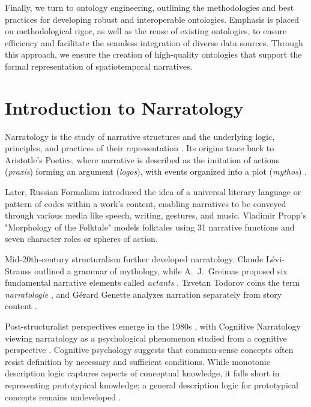 Finally, we turn to ontology engineering, outlining the methodologies and best practices for developing robust and interoperable ontologies. Emphasis is placed on methodological rigor, as well as the reuse of existing ontologies, to ensure efficiency and facilitate the seamless integration of diverse data sources. Through this approach, we ensure the creation of high-quality ontologies that support the formal representation of spatiotemporal narratives. 

\section{Introduction to Narratology}\label{II-sec:narratology}

Narratology is the study of narrative structures and the underlying logic, principles, and practices of their representation \cite{hermanBasicElementsNarrative2009}. Its origins trace back to Aristotle's Poetics, where narrative is described as the imitation of actions (\emph{praxis}) forming an argument (\emph{logos}), with events organized into a plot (\emph{mythos}) \cite{aristotelesPoetica2010}.

Later, Russian Formalism introduced the idea of a universal literary language or pattern of codes within a work's content, enabling narratives to be conveyed through various media like speech, writing, gestures, and music. Vladimir Propp's "Morphology of the Folktale" \cite{proppMorphologyFolktale1968} models folktales using 31 narrative functions and seven character roles or spheres of action.

Mid-20th-century structuralism further developed narratology. Claude Lévi-Strauss outlined a grammar of mythology, while A.~J.~Greimas proposed six fundamental narrative elements called \emph{actants} \cite{greimasStructuralSemanticsAttempt1983}. Tzvetan Todorov coins the term \emph{narratologie} \cite{todorovGrammaireDecameron1969}, and Gérard Genette analyzes narration separately from story content \cite{genetteNarrativeDiscourseEssay1990}.

Post-structuralist perspectives emerge in the 1980s \cite{fludernikHistoriesNarrativeTheory2005}, with Cognitive Narratology viewing narratology as a psychological phenomenon studied from a cognitive perspective \cite{davidhermanNarratologyCognitiveScience2000}. Cognitive psychology suggests that common-sense concepts often resist definition by necessary and sufficient conditions. While monotonic description logic captures aspects of conceptual knowledge, it falls short in representing prototypical knowledge; a general description logic for prototypical concepts remains undeveloped \cite{frixioneRepresentingConceptsFormal2012, lietoHybridRepresentationalProposal2014}.

